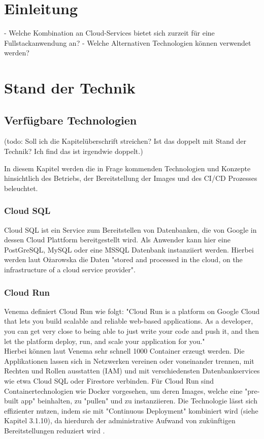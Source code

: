 \documentclass[pdftex,a4paper,abstracton,11pt,parskip=half,bibtotocnumbered]{scrartcl}
\begin{document}
\section{Einleitung}
 - Welche Kombination an Cloud-Services bietet sich zurzeit für eine Fullstackanwendung an?
 - Welche Alternativen Technologien können verwendet werden?


\section{Stand der Technik}
	
	\subsection{Verfügbare Technologien} 
	(todo: Soll ich die Kapitelüberschrift streichen? Ist das doppelt mit Stand der Technik? Ich find das ist irgendwie doppelt.)

	In diesem Kapitel werden die in Frage kommenden Technologien und Konzepte hinsichtlich des Betriebs, der Bereitstellung der Images und des
	CI/CD Prozesses beleuchtet. 

		\subsubsection{Cloud SQL}		
			Cloud SQL ist ein Service zum Bereitstellen von Datenbanken, die von Google in dessen Cloud Plattform bereitgestellt wird. Als Anwender kann hier eine
			PostGreSQL, MySQL oder eine MSSQL Datenbank instanziiert werden. Hierbei werden laut Ożarowska die Daten "stored and processed in the cloud, on the infrastructure of a cloud 
			service provider". \cite{cloudsql}

		\subsubsection{Cloud Run}
			Venema definiert Cloud Run wie folgt: "Cloud Run is a platform on Google Cloud that lets you build scalable and reliable web-based applications. As
 			a developer, you can get very close to being able to just write your code and push it, and then let the platform deploy, run, and scale your application for you." \cite[S.1]{Venema} \\
			Hierbei können laut Venema sehr schnell 1000 Container erzeugt werden. \cite[vgl.][S.XVI]{Venema}
			Die Applikationen lassen sich in Netzwerken vereinen oder voneinander trennen, mit Rechten und Rollen ausstatten (IAM) und mit verschiedensten 
			Datenbankservices wie etwa Cloud SQL oder Firestore verbinden. Für Cloud Run sind Containertechnologien wie Docker vorgesehen, um deren Images, 
			welche eine "pre-built app" \cite{cloud-run-johnson} beinhalten, zu "pullen" und zu instanziieren. Die Technologie lässt sich effizienter nutzen, indem sie mit "Continuous 
			Deployment" kombiniert wird (siehe Kapitel 3.1.10), da hierdurch der administrative Aufwand von zukünftigen Bereitstellungen reduziert wird \cite{whats-cd-lamm}.
\end{document}
